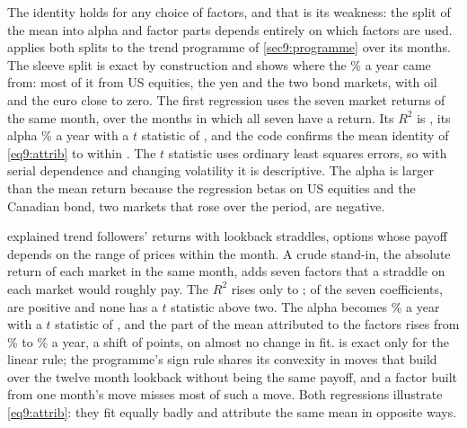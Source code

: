 \begin{chapterrefs}
The identity holds for any choice of factors, and that is its weakness: the split of the mean into
alpha and factor parts depends entirely on which factors are used.  applies both splits
to the trend programme of \cref{sec9:programme} over its \dcMonths{} months. The sleeve split is exact by
construction and shows where the \dcMean\% a year came from: most of it from US equities, the yen and the
two bond markets, with oil and the euro close to zero. The first regression uses the seven market
returns of the same month, over the \dcRegMonths{} months in which all seven have a return. Its $R^2$ is \dcRtwoA, its alpha \dcAlphaA\% a year with a $t$ statistic of \dcTA,
and the code confirms the mean identity of \cref{eq9:attrib} to within \dcIdGap. The $t$ statistic uses
ordinary least squares errors, so with serial dependence and changing volatility it is descriptive. The alpha is larger than
the mean return because the regression betas on US equities and the Canadian bond, two markets that
rose over the period, are negative.

\textcite{fung2001} explained trend followers' returns with lookback straddles, options whose payoff
depends on the range of prices within the month. A crude stand-in, the absolute return of each market
in the same month, adds seven factors that a straddle on each market would roughly pay. The $R^2$ rises
only to \dcRtwoB; of the seven coefficients, \dcAbsPos{} are positive and none has a $t$ statistic above two.
The alpha becomes \dcAlphaB\% a year with a $t$ statistic of \dcTB, and the part of the mean attributed
to the factors rises from \dcLoadPartA\% to \dcLoadPart\% a year, a shift of \dcLoadShift{} points, on almost
no change in fit.  is exact only for the linear rule; the programme's sign rule
shares its convexity in moves that build over the twelve month lookback without being the same payoff,
and a factor built from one month's move misses most of such a move. Both regressions illustrate \cref{eq9:attrib}: they fit equally badly and
attribute the same mean in opposite ways.


\end{chapterrefs}
